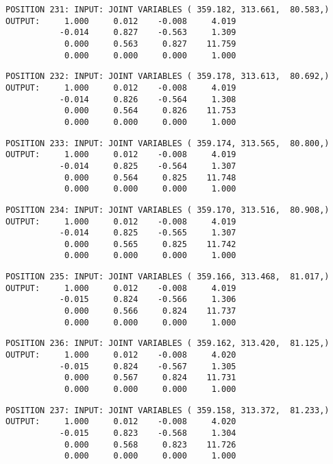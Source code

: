 \begin{verbatim}
POSITION 231: INPUT: JOINT VARIABLES ( 359.182, 313.661,  80.583,)
OUTPUT:     1.000     0.012    -0.008     4.019
           -0.014     0.827    -0.563     1.309
            0.000     0.563     0.827    11.759
            0.000     0.000     0.000     1.000
\end{verbatim} \pagebreak[1]\begin{verbatim}
POSITION 232: INPUT: JOINT VARIABLES ( 359.178, 313.613,  80.692,)
OUTPUT:     1.000     0.012    -0.008     4.019
           -0.014     0.826    -0.564     1.308
            0.000     0.564     0.826    11.753
            0.000     0.000     0.000     1.000
\end{verbatim} \pagebreak[1]\begin{verbatim}
POSITION 233: INPUT: JOINT VARIABLES ( 359.174, 313.565,  80.800,)
OUTPUT:     1.000     0.012    -0.008     4.019
           -0.014     0.825    -0.564     1.307
            0.000     0.564     0.825    11.748
            0.000     0.000     0.000     1.000
\end{verbatim} \pagebreak[1]\begin{verbatim}
POSITION 234: INPUT: JOINT VARIABLES ( 359.170, 313.516,  80.908,)
OUTPUT:     1.000     0.012    -0.008     4.019
           -0.014     0.825    -0.565     1.307
            0.000     0.565     0.825    11.742
            0.000     0.000     0.000     1.000
\end{verbatim} \pagebreak[1]\begin{verbatim}
POSITION 235: INPUT: JOINT VARIABLES ( 359.166, 313.468,  81.017,)
OUTPUT:     1.000     0.012    -0.008     4.019
           -0.015     0.824    -0.566     1.306
            0.000     0.566     0.824    11.737
            0.000     0.000     0.000     1.000
\end{verbatim} \pagebreak[1]\begin{verbatim}
POSITION 236: INPUT: JOINT VARIABLES ( 359.162, 313.420,  81.125,)
OUTPUT:     1.000     0.012    -0.008     4.020
           -0.015     0.824    -0.567     1.305
            0.000     0.567     0.824    11.731
            0.000     0.000     0.000     1.000
\end{verbatim} \pagebreak[1]\begin{verbatim}
POSITION 237: INPUT: JOINT VARIABLES ( 359.158, 313.372,  81.233,)
OUTPUT:     1.000     0.012    -0.008     4.020
           -0.015     0.823    -0.568     1.304
            0.000     0.568     0.823    11.726
            0.000     0.000     0.000     1.000
\end{verbatim} \pagebreak[1]\begin{verbatim}

\end{verbatim}
